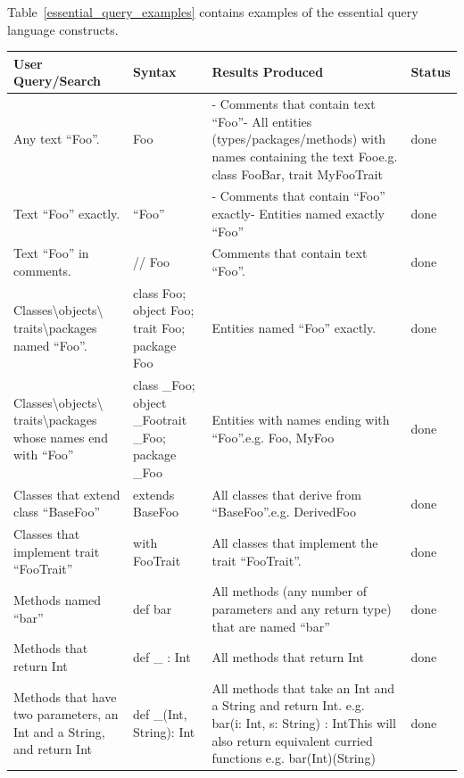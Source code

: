 Table~\ref{essential_query_examples} contains examples of the essential query language constructs. 
\begin{table}[htbp]
\begin{center}
\begin{tabular}{|p{1.4in}|p{0.7in}|p{1.8in}|p{0.4in}|} \hline 
\textbf{User Query/Search} & \textbf{Syntax} & \textbf{Results Produced} & Status  \\ \hline 
[q1] Any text ``Foo''. & Foo & - Comments that contain text ``Foo''\newline - All entities (types/packages/methods) with names containing the text Fooe.g. class FooBar, trait MyFooTrait & done \\ \hline 
[q2] Text ``Foo'' exactly. & ``Foo'' & - Comments that contain ``Foo'' exactly\newline - Entities named exactly ``Foo'' & done \\ \hline 
[q3] Text ``Foo'' in comments. & // Foo & Comments that contain text ``Foo''. & done \\ \hline 
[q4] Classes\textbackslash objects\textbackslash \textbf{ }
traits\textbackslash packages named ``Foo''. & class Foo; object Foo; trait Foo; package Foo & Entities named ``Foo'' exactly. & done \\ \hline 
[q5] Classes\textbackslash objects\textbackslash \textbf{ } traits\textbackslash packages whose names end with ``Foo'' & class \_Foo; object \_Footrait \_Foo; package \_Foo & Entities with names ending with ``Foo''.\newline e.g. Foo, MyFoo & done \\ \hline 
[q6] Classes that extend class ``BaseFoo'' & extends BaseFoo & All classes that derive from ``BaseFoo''.\newline e.g. DerivedFoo & done \\ \hline 
[q7] Classes that implement trait ``FooTrait'' & with FooTrait & All classes that implement the trait ``FooTrait''. & done \\ \hline 
[q8] Methods named ``bar'' & def bar & All methods (any number of parameters and any return type) that are named ``bar'' & done \\ \hline 
[q9] Methods that return Int & def \_ : Int & All methods that return Int & done \\ \hline 
[q10] Methods that have two parameters, an Int and a String, and return Int & def \_(Int, String): Int & All methods that take an Int and a String and return Int. e.g. bar(i: Int, s: String) : Int\newline \newline This will also return equivalent curried functions e.g. bar(Int)(String) & done \\ \hline 

\end{tabular}
\end{center}
\end{table}
